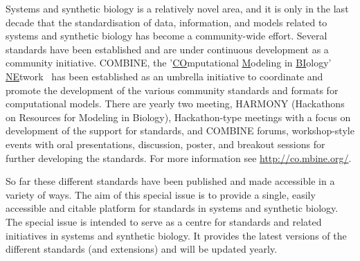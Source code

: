 \documentclass{jib}
\begin{document}
Systems and synthetic biology is a relatively novel area, and it is only in the last decade that the standardisation of data, information, and models related to systems and synthetic biology has  become a community-wide effort. Several standards have been established and are under continuous development as a community initiative. COMBINE, the '\underline{CO}mputational \underline{M}odeling in \underline{BI}ology' \underline{NE}twork~\cite{hucka2015promoting} has been established as an umbrella  initiative to coordinate and promote the development of the various community standards and formats for computational models. There are yearly two meeting, HARMONY (Hackathons on Resources for Modeling in Biology), Hackathon-type meetings with a focus on development of the support for standards, and COMBINE forums, workshop-style events with oral presentations, discussion, poster, and breakout sessions for  further developing the standards. For more information see \url{http://co.mbine.org/}. 

So far these different standards have been published and made accessible in a variety of ways. The aim of this special issue is to provide a single, easily accessible and citable platform for standards in systems and synthetic biology. The special issue is intended to serve as a centre for standards and related initiatives in systems and synthetic biology. It provides the latest versions of the different standards (and extensions) and will be updated yearly. 
\end{document}
